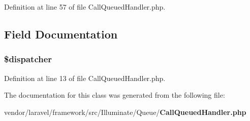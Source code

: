 Definition at line 57 of file Call\+Queued\+Handler.\+php.



\subsection{Field Documentation}
\subsubsection[{\$dispatcher}]{\setlength{\rightskip}{0pt plus 5cm}\$dispatcher\hspace{0.3cm}{\ttfamily [protected]}}\label{class_illuminate_1_1_queue_1_1_call_queued_handler_ab1d5b769b8d51cf3de5b1f1c4a9e6298}


Definition at line 13 of file Call\+Queued\+Handler.\+php.



The documentation for this class was generated from the following file\+:\begin{DoxyCompactItemize}
\item 
vendor/laravel/framework/src/\+Illuminate/\+Queue/{\bf Call\+Queued\+Handler.\+php}\end{DoxyCompactItemize}
